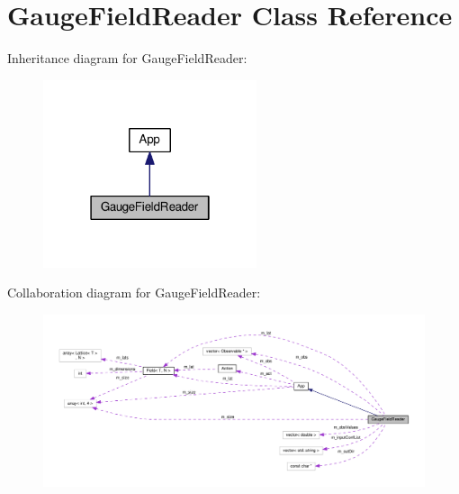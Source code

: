 \hypertarget{classGaugeFieldReader}{}\section{Gauge\+Field\+Reader Class Reference}
\label{classGaugeFieldReader}


Inheritance diagram for Gauge\+Field\+Reader\+:\nopagebreak
\begin{figure}[H]
\begin{center}
\leavevmode
\includegraphics[width=178pt]{d8/dcd/classGaugeFieldReader__inherit__graph}
\end{center}
\end{figure}


Collaboration diagram for Gauge\+Field\+Reader\+:
\nopagebreak
\begin{figure}[H]
\begin{center}
\leavevmode
\includegraphics[width=350pt]{d7/d2a/classGaugeFieldReader__coll__graph}
\end{center}
\end{figure}
